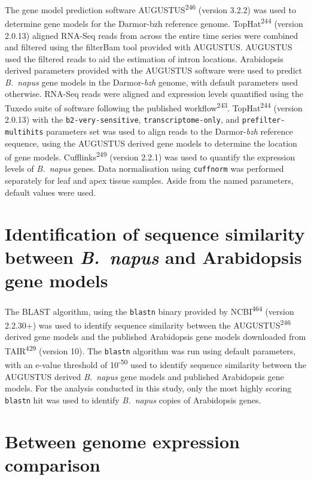\documentclass[12pt,]{book}
\begin{document}
The gene model prediction software AUGUSTUS\textsuperscript{246}
(version 3.2.2) was used to determine gene models for the Darmor-bzh
reference genome. TopHat\textsuperscript{244} (version 2.0.13) aligned
RNA-Seq reads from across the entire time series were combined and
filtered using the filterBam tool provided with AUGUSTUS. AUGUSTUS used
the filtered reads to aid the estimation of intron locations.
Arabidopsis derived parameters provided with the AUGUSTUS software were
used to predict \emph{B.~napus} gene models in the Darmor-\emph{bzh}
genome, with default parameters used otherwise. RNA-Seq reads were
aligned and expression levels quantified using the Tuxedo suite of
software following the published workflow\textsuperscript{243}.
TopHat\textsuperscript{244} (version 2.0.13) with the
\texttt{b2-very-sensitive}, \texttt{transcriptome-only}, and
\texttt{prefilter-multihits} parameters set was used to align reads to
the Darmor-\emph{bzh} reference sequence, using the AUGUSTUS derived
gene models to determine the location of gene models.
Cufflinks\textsuperscript{249} (version 2.2.1) was used to quantify the
expression levels of \emph{B.~napus} genes. Data normalisation using
\texttt{cuffnorm} was performed separately for leaf and apex tissue
samples. Aside from the named parameters, default values were used.

\section{\texorpdfstring{Identification of sequence similarity between
\emph{B.~napus} and Arabidopsis gene
models}{Identification of sequence similarity between B.~napus and Arabidopsis gene models}}\label{section:methods:sequencesimilarity}

The BLAST algorithm, using the \texttt{blastn} binary provided by
NCBI\textsuperscript{464} (version 2.2.30+) was used to identify
sequence similarity between the AUGUSTUS\textsuperscript{246} derived
gene models and the published Arabidopsis gene models downloaded from
TAIR\textsuperscript{429} (version 10). The \texttt{blastn} algorithm
was run using default parameters, with an e-value threshold of
10\textsuperscript{-50} used to identify sequence similarity between the
AUGUSTUS derived \emph{B.~napus} gene models and published Arabidopsis
gene models. For the analysis conducted in this study, only the most
highly scoring \texttt{blastn} hit was used to identify \emph{B.~napus}
copies of Arabidopsis genes.

\section{Between genome expression
comparison}\label{between-genome-expression-comparison}
\end{document}
